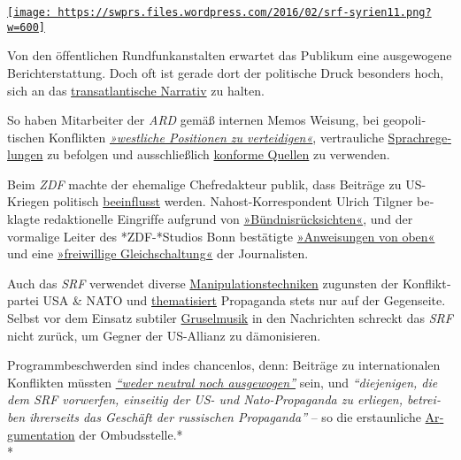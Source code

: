 \href{https://swprs.org/2017/03/01/propaganda-im-staatsauftrag/}{\texttt{[image: https://swprs.files.wordpress.com/2016/02/srf-syrien11.png?w=600]}}

Von den öf‌fentlichen Rund­funk­an­stalten er­war­tet das Pu­bli­kum
eine aus­ge­wogene Bericht­er­stattung. Doch of‌t ist ge­rade dort der
politische Druck be­sonders hoch, sich an das
\href{https://swprs.org/das-gewuenschte-narrativ/}{trans­at­lan­tische
Narra­tiv} zu halten.

So haben Mitarbeiter der \emph{ARD} gemäß internen Memos Weisung, bei
geo­po­li­tischen Kon­f‌lik­ten
\emph{\href{https://www.heise.de/tp/features/Ukraine-Konflikt-ARD-Programmbeirat-bestaetigt-Publikumskritik-3367400.html}{»west­liche
Posi­tionen zu ver­tei­di­gen«}}, ver­trau­liche
\href{https://www.heise.de/tp/features/Die-vertraulichen-Sprachregelungen-der-ARD-3758887.html}{Sprach­­re­­ge­lungen}
zu be­fol­gen und aus­­schließ­­lich
\href{https://www.oxmoxhh.de/magazin/story-interview/oxmox-exklusiv-interview-mit-volker-braeutigam-friedhelm-klinkhammer/}{konforme
Quellen} zu ver­wen­den.

Beim \emph{ZDF} machte der ehe­ma­lige Chef­re­dakteur publik, dass
Bei­träge zu US-Kriegen poli­tisch
\href{https://www.youtube.com/watch?v=i2423aDq_hE}{be­ein­f‌‌lusst}
werden. Nahost-Kor­res­pon­dent Ulrich Tilgner be­klagte
re­dak­tio­nelle Ein­grif‌fe aufgrund von
\href{http://www.berliner-zeitung.de/korrespondent-ulrich-tilgner-sucht-mehr-distanz-zum-zdf--ich-fuehle-mich-eingeschraenkt--15870684}{»Bünd­nis­rück­sich­ten«},
und der vormalige Leiter des *ZDF-*Studios Bonn be­stä­tig­te
\href{https://propagandaschau.wordpress.com/2016/01/30/wolfgang-herles-es-gibt-in-den-oeffentlich-rechtlichen-anweisungen-von-oben/}{»An­wei­sungen
von oben«} und eine
\href{http://www.rolandtichy.de/daili-es-sentials/meinungsfreiheit-anordnung-zur-anpassung/}{»frei­willige
Gleich­schal­tung«} der Jour­na­lis­ten.

Auch das \emph{SRF} verwendet diverse
\href{https://swprs.org/srf-propaganda-analyse/}{Mani­pu­lations­tech­niken}
zugunsten der Konflikt­partei USA \& NATO und
\href{http://www.srf.ch/sendungen/srfglobal/propagandagruesse-aus-moskau-2}{thematisiert}
Propaganda stets nur auf der Gegenseite. Selbst vor dem Einsatz
sub­tiler
\href{http://www.srf.ch/play/tv/10vor10/video/warum-assad-bleibt?id=a6d267c9-52b3-470b-868e-95bb919a0b96}{Grusel­musik}
in den Nach­rich­ten schreckt das \emph{SRF} nicht zurück, um Gegner der
US-Allianz zu dämo­ni­sieren.

Programmbe­schwer­den sind indes chan­cen­los, denn: Beiträge zu
inter­na­tio­nalen Kon­flik­ten müssten
\emph{\href{https://swprs.org/srf-ombudsstelle-im-faktencheck/}{``weder
neutral noch ausgewogen''}} sein, und \emph{``die­je­ni­gen, die dem SRF
vor­wer­fen, ein­sei­tig der US- und Nato-Pro­pa­gan­da zu er­lie­gen,
be­trei­ben ihrer­seits das Ge­schäf‌t der russischen Pro­pa­ganda''} --
so die erstaun­liche
\href{https://swprs.org/srf-ombudsstelle-im-faktencheck/}{Ar­gu­men­ta­tion}
der Om­buds­stelle.*\\
*

